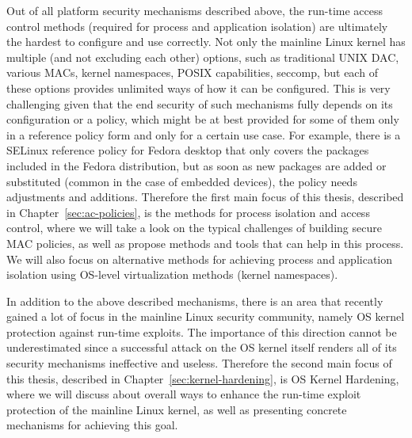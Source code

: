 Out of all platform security mechanisms described above, the run-time access control methods (required for process and application isolation) are ultimately the hardest to configure and use correctly. Not only the mainline Linux kernel has multiple (and not excluding each other) options, such as traditional UNIX DAC, various MACs, kernel namespaces, POSIX capabilities, seccomp, but each of these options provides unlimited ways of how it can be configured. This is very challenging given that the end security of such mechanisms fully depends on its configuration or a policy, which might be at best provided for some of them only in a reference policy form and only for a certain use case. For example, there is a SELinux reference policy for Fedora desktop that only covers the packages included in the Fedora distribution, but as soon as new packages are added or substituted (common in the case of embedded devices), the policy needs adjustments and additions. Therefore the first main focus of this thesis, described in Chapter~\ref{sec:ac-policies}, is the methods for process isolation and access control, where we will take a look on the typical challenges of building secure MAC policies, as well as propose methods and tools that can help in this process. We will also focus on alternative methods for achieving process and application isolation using OS-level virtualization methods (kernel namespaces). 

In addition to the above described mechanisms, there is an area that recently gained a lot of focus in the mainline Linux security community, namely OS kernel protection against run-time exploits. The importance of this direction cannot be underestimated since a successful attack on the OS kernel itself renders all of its security mechanisms ineffective and useless. Therefore the second main focus of this thesis, described in Chapter~\ref{sec:kernel-hardening}, is OS Kernel Hardening, where we will discuss about overall ways to enhance the run-time exploit protection of the mainline Linux kernel, as well as presenting concrete mechanisms for achieving this goal. 
 